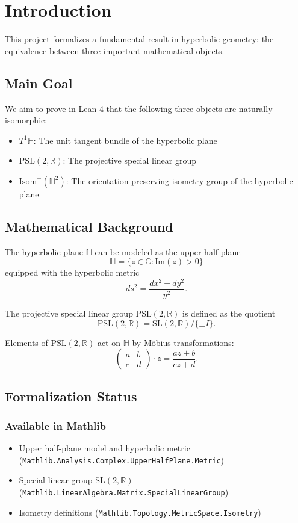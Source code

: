 \chapter{Introduction}

This project formalizes a fundamental result in hyperbolic geometry: the equivalence between three important mathematical objects.

\section{Main Goal}

We aim to prove in Lean 4 that the following three objects are naturally isomorphic:
\begin{itemize}
\item $T^1\mathbb{H}$: The unit tangent bundle of the hyperbolic plane
\item $\mathrm{PSL}(2,\mathbb{R})$: The projective special linear group
\item $\mathrm{Isom}^+(\mathbb{H}^2)$: The orientation-preserving isometry group of the hyperbolic plane
\end{itemize}

\section{Mathematical Background}

The hyperbolic plane $\mathbb{H}$ can be modeled as the upper half-plane
\[ \mathbb{H} = \{z \in \mathbb{C} : \mathrm{Im}(z) > 0\} \]
equipped with the hyperbolic metric
\[ ds^2 = \frac{dx^2 + dy^2}{y^2}. \]

The projective special linear group $\mathrm{PSL}(2,\mathbb{R})$ is defined as the quotient
\[ \mathrm{PSL}(2,\mathbb{R}) = \mathrm{SL}(2,\mathbb{R}) / \{\pm I\}. \]

Elements of $\mathrm{PSL}(2,\mathbb{R})$ act on $\mathbb{H}$ by Möbius transformations:
\[ \begin{pmatrix} a & b \\ c & d \end{pmatrix} \cdot z = \frac{az + b}{cz + d}. \]

\section{Formalization Status}

\subsection{Available in Mathlib}
\begin{itemize}
\item Upper half-plane model and hyperbolic metric (\texttt{Mathlib.Analysis.Complex.UpperHalfPlane.Metric})
\item Special linear group $\mathrm{SL}(2,\mathbb{R})$ (\texttt{Mathlib.LinearAlgebra.Matrix.SpecialLinearGroup})
\item Isometry definitions (\texttt{Mathlib.Topology.MetricSpace.Isometry})
\end{itemize}

